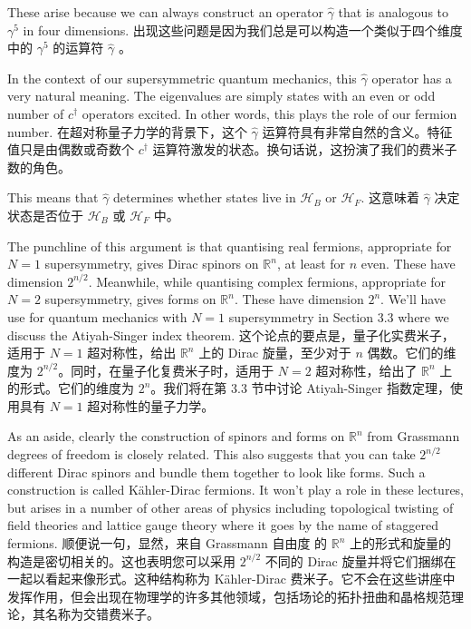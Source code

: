\documentclass{article}
\begin{document}
\begin{paracol}{2}
These arise because we can always construct an operator $\hat{\gamma}$ that is analogous to $\gamma^5$ in four dimensions.
\switchcolumn
出现这些问题是因为我们总是可以构造一个类似于四个维度中的 $\gamma^5$ 的运算符 $\hat{\gamma}$ 。
\switchcolumn*

In the context of our supersymmetric quantum mechanics, this $\hat{\gamma}$ operator has a very natural meaning. The eigenvalues are simply states with an even or odd number of $c^{\dagger}$ operators excited. In other words, this plays the role of our fermion number.
\switchcolumn
在超对称量子力学的背景下，这个 $\hat{\gamma}$ 运算符具有非常自然的含义。特征值只是由偶数或奇数个 $c^{\dagger}$ 运算符激发的状态。换句话说，这扮演了我们的费米子数的角色。
\switchcolumn*

This means that $\hat{\gamma}$ determines whether states live in $\mathcal{H}_B$ or $\mathcal{H}_F$.
\switchcolumn
这意味着 $\hat{\gamma}$ 决定状态是否位于 $\mathcal{H}_B$ 或 $\mathcal{H}_F$ 中。
\switchcolumn*

The punchline of this argument is that quantising real fermions, appropriate for $N = 1$ supersymmetry, gives Dirac spinors on $\mathbb{R}^{n}$, at least for $n$ even. These have dimension $2^{n/2}$. Meanwhile, while quantising complex fermions, appropriate for $N = 2$ supersymmetry, gives forms on $\mathbb{R}^{n}$. These have dimension $2^n$. We'll have use for quantum mechanics with $N = 1$ supersymmetry in Section 3.3 where we discuss the Atiyah-Singer index theorem.
\switchcolumn
这个论点的要点是，量子化实费米子，适用于 $N = 1$ 超对称性，给出 $\mathbb{R}^{n}$ 上的 Dirac 旋量，至​​少对于 $n$ 偶数。它们的维度为 $2^{n/2}$。同时，在量子化复费米子时，适用于 $N = 2$ 超对称性，给出了 $\mathbb{R}^{n}$ 上的形式。它们的维度为 $2^n$。我们将在第 3.3 节中讨论 Atiyah-Singer 指数定理，使用具有 $N = 1$ 超对称性的量子力学。
\switchcolumn*

As an aside, clearly the construction of spinors and forms on $\mathbb{R}^{n}$ from Grassmann degrees of freedom is closely related. This also suggests that you can take $2^{n/2}$ different Dirac spinors and bundle them together to look like forms. Such a construction is called Kähler-Dirac fermions. It won't play a role in these lectures, but arises in a number of other areas of physics including topological twisting of field theories and lattice gauge theory where it goes by the name of staggered fermions.
\switchcolumn
顺便说一句，显然，来自 Grassmann 自由度 的 $\mathbb{R}^{n}$ 上的形式和旋量的构造是密切相关的。这也表明您可以采用 $2^{n/2}$ 不同的 Dirac 旋量并将它们捆绑在一起以看起来像形式。这种结构称为 Kähler-Dirac 费米子。它不会在这些讲座中发挥作用，但会出现在物理学的许多其他领域，包括场论的拓扑扭曲和晶格规范理论，其名称为交错费米子。
\switchcolumn*


\end{paracol}
\end{document}
